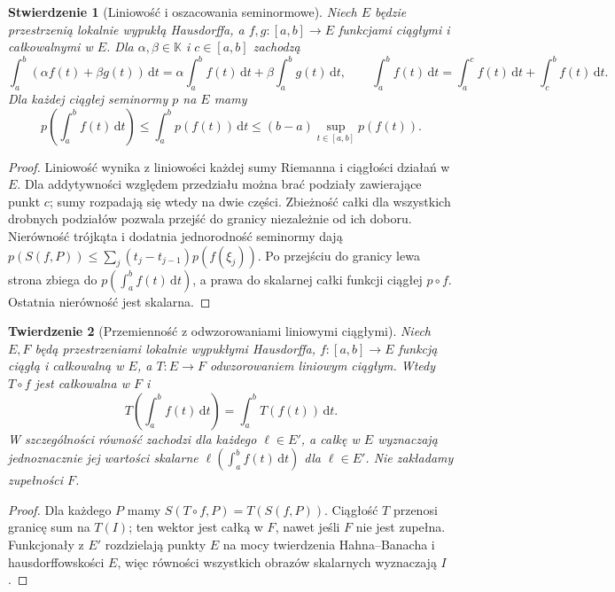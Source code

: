 \documentclass[11pt,a4paper]{article}
\numberwithin{equation}{section}
\theoremstyle{plain}
\newtheorem{twierdzenie}{Twierdzenie}[section]
\newtheorem{stwierdzenie}[twierdzenie]{Stwierdzenie}
\theoremstyle{definition}
\theoremstyle{remark}
\newcommand{\K}{\mathbb K}
\begin{document}
\begin{stwierdzenie}[Liniowość i oszacowania seminormowe]
\label{prop:riemann-seminorm15a}
Niech $E$ będzie przestrzenią lokalnie wypukłą Hausdorffa,
a $f,g:[a,b]\to E$ funkcjami ciągłymi i całkowalnymi w $E$.
Dla $\alpha,\beta\in\K$ i $c\in[a,b]$ zachodzą
\[
 \int_a^b(\alpha f(t)+\beta g(t))\,\mathrm dt
 =\alpha\int_a^b f(t)\,\mathrm dt+\beta\int_a^b g(t)\,\mathrm dt,
 \qquad \int_a^b f(t)\,\mathrm dt=\int_a^c f(t)\,\mathrm dt
 +\int_c^b f(t)\,\mathrm dt.
\]
Dla każdej ciągłej seminormy $p$ na $E$ mamy
\[
 p\left(\int_a^b f(t)\,\mathrm dt\right)
 \le\int_a^b p(f(t))\,\mathrm dt
 \le (b-a)\sup_{t\in[a,b]}p(f(t)).
\]
\end{stwierdzenie}
\begin{proof}
Liniowość wynika z liniowości każdej sumy Riemanna i ciągłości
działań w $E$. Dla addytywności względem przedziału można brać
podziały zawierające punkt $c$; sumy rozpadają się wtedy na dwie
części. Zbieżność całki dla wszystkich drobnych podziałów
pozwala przejść do granicy niezależnie od ich doboru.
Nierówność trójkąta i dodatnia jednorodność seminormy dają
$p(S(f,P))\le\sum_j(t_j-t_{j-1})p(f(\xi_j))$.
Po przejściu do granicy lewa strona zbiega do
$p(\int_a^b f(t)\,\mathrm dt)$, a prawa do skalarnej
całki funkcji ciągłej $p\circ f$. Ostatnia nierówność jest skalarna.
\end{proof}

\begin{twierdzenie}[Przemienność z odwzorowaniami liniowymi ciągłymi]
\label{thm:riemann-functorial15a}
Niech $E,F$ będą przestrzeniami lokalnie wypukłymi Hausdorffa,
$f:[a,b]\to E$ funkcją ciągłą i całkowalną w $E$, a
$T:E\to F$ odwzorowaniem liniowym ciągłym. Wtedy $T\circ f$
jest całkowalna w $F$ i
\[
 T\left(\int_a^b f(t)\,\mathrm dt\right)
 =\int_a^b T(f(t))\,\mathrm dt.
\]
W szczególności równość zachodzi dla każdego $\ell\in E'$, a
całkę w $E$ wyznaczają jednoznacznie jej wartości skalarne
$\ell(\int_a^b f(t)\,\mathrm dt)$ dla $\ell\in E'$.
Nie zakładamy zupełności $F$.
\end{twierdzenie}
\begin{proof}
Dla każdego $P$ mamy $S(T\circ f,P)=T(S(f,P))$.
Ciągłość $T$ przenosi granicę sum na $T(I)$; ten wektor jest
całką w $F$, nawet jeśli $F$ nie jest zupełna.
Funkcjonały z $E'$ rozdzielają punkty $E$ na mocy
twierdzenia Hahna--Banacha i hausdorffowskości $E$,
więc równości wszystkich obrazów skalarnych wyznaczają $I$.
\end{proof}
\end{document}
